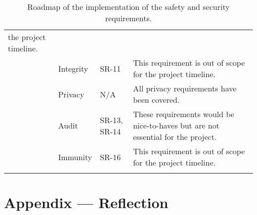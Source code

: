 \documentclass{article}
\begin{document}
\begin{longtable}[c]{|m{2cm}|m{2.6cm}|m{2cm}|m{3.8cm}|}
    the project timeline.\\
    \cline{2-4}
    & Integrity & SR-11 & This requirement is out of scope for the project
    timeline.\\
    \cline{2-4}
    & Privacy & N/A & All privacy requirements have been covered.\\
    \cline{2-4}
    & Audit & SR-13, SR-14 & These requirements would be nice-to-haves but are
    not essential for the project.\\
    \cline{2-4}
    & Immunity & SR-16 & This requirement is out of scope for the project
    timeline.\\
    \hline
    \caption{Roadmap of the implementation of the safety and security requirements.}
\end{longtable}

\newpage{}

\section*{Appendix --- Reflection}
\end{document}
